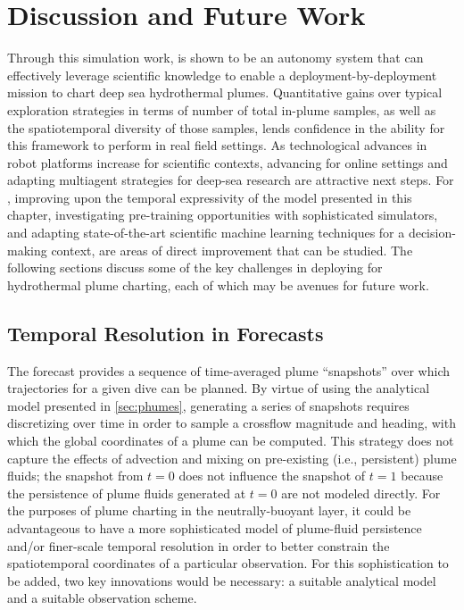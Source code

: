 \section{Discussion and Future Work}
\label{sec:phortex_future}
Through this simulation work, \PHORTEX is shown to be an autonomy system that can effectively leverage scientific knowledge to enable a deployment-by-deployment mission to chart deep sea hydrothermal plumes. Quantitative gains over typical exploration strategies in terms of number of total in-plume samples, as well as the spatiotemporal diversity of those samples, lends confidence in the ability for this framework to perform in real field settings. As technological advances in robot platforms increase for scientific contexts, advancing \PHORTEX for online settings and adapting multiagent strategies for deep-sea research are attractive next steps. For \PHUMES, improving upon the temporal expressivity of the model presented in this chapter, investigating pre-training opportunities with sophisticated simulators, and adapting state-of-the-art scientific machine learning techniques for a decision-making context, are areas of direct improvement that can be studied. The following sections discuss some of the key challenges in deploying \PHORTEX for hydrothermal plume charting, each of which may be avenues for future work.

\subsection{Temporal Resolution in \PHUMES Forecasts}
The \PHUMES forecast provides a sequence of time-averaged plume ``snapshots'' over which trajectories for a given dive can be planned. By virtue of using the analytical model presented in \cref{sec:phumes}, generating a series of snapshots requires discretizing over time in order to sample a crossflow magnitude and heading, with which the global coordinates of a plume can be computed. This strategy does not capture the effects of advection and mixing on pre-existing (i.e., persistent) plume fluids; the snapshot from $t=0$ does not influence the snapshot of $t=1$ because the persistence of plume fluids generated at $t=0$ are not modeled directly. For the purposes of plume charting in the neutrally-buoyant layer, it could be advantageous to have a more sophisticated model of plume-fluid persistence and/or finer-scale temporal resolution in order to better constrain the spatiotemporal coordinates of a particular observation. For this sophistication to be added, two key innovations would be necessary: a suitable analytical model and a suitable observation scheme.

